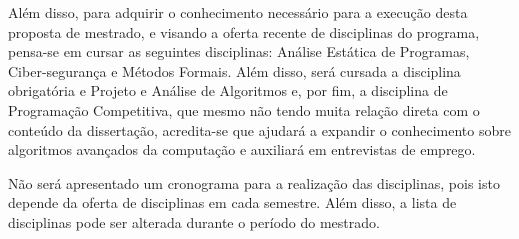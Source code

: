 \documentclass[12pt]{article}
\newcommand{\comment}[1]{\textcolor{purple}{(#1)}}
\newcommand{\hash}{\textit{hash}}
\begin{document}
\vspace{0.5cm}

Além disso, para adquirir o conhecimento necessário para a execução desta proposta de mestrado, e visando a oferta recente de disciplinas do programa, pensa-se em cursar as seguintes disciplinas: Análise Estática de Programas, Ciber-segurança e Métodos Formais. Além disso, será cursada a disciplina obrigatória e Projeto e Análise de Algoritmos e, por fim, a disciplina de Programação Competitiva, que mesmo não tendo muita relação direta com o conteúdo da dissertação, acredita-se que ajudará a expandir o conhecimento sobre algoritmos avançados da computação e auxiliará em entrevistas de emprego.



Não será apresentado um cronograma para a realização das disciplinas, pois isto depende da oferta de disciplinas em cada semestre. Além disso, a lista de disciplinas pode ser alterada durante o período do mestrado.



    







\end{document}
